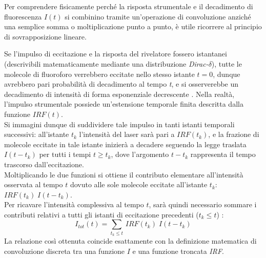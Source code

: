 Per comprendere fisicamente perché la risposta strumentale e il decadimento di fluorescenza $I(t)$ si combinino tramite un'operazione di convoluzione anziché una semplice somma o moltiplicazione punto a punto, è utile ricorrere al principio di sovrapposizione lineare.

Se l'impulso di eccitazione e la risposta del rivelatore fossero istantanei (descrivibili matematicamente mediante una distribuzione \textit{Dirac-$\delta$}), tutte le molecole di fluoroforo verrebbero eccitate nello stesso istante $t=0$, dunque avrebbero pari probabilità di decadimento al tempo \textit{t}, e si osserverebbe un decadimento di intensità di forma esponenziale decrescente \cite[Sez. 4.3.3]{lakowiczPrinciplesFluorescenceSpectroscopy2006}.
Nella realtà, l'impulso strumentale possiede un'estensione temporale finita descritta dalla funzione $\textit{IRF}(t)$.\\
Si immagini dunque di suddividere tale impulso in tanti istanti temporali successivi: all'istante $t_k$ l'intensità del laser sarà pari a $\textit{IRF}(t_k)$, e la frazione di molecole eccitate in tale istante inizierà a decadere seguendo la legge traslata $I(t-t_k)$ per tutti i tempi $t\ge t_k$, dove l'argomento $t-t_k$ rappresenta il tempo trascorso dall'eccitazione.\\
Moltiplicando le due funzioni si ottiene il contributo elementare all'intensità osservata al tempo $t$ dovuto alle sole molecole eccitate all'istante $t_k$: $\textit{IRF}(t_k)\;I(t-t_k)$.\\
Per ricavare l'intensità complessiva al tempo $t$, sarà quindi necessario sommare i contributi relativi a tutti gli istanti di eccitazione precedenti ($t_k\le t$) \cite[Sez. 4.3.3]{lakowiczPrinciplesFluorescenceSpectroscopy2006}:
\begin{equation}
    I_{tot}(t) = \sum_{t_k \le t} \, \textit{IRF}(t_k) \; I(t - t_k)
    \label{eq:convoluzione}
\end{equation}
La relazione così ottenuta coincide esattamente con la definizione matematica di convoluzione discreta tra una funzione $I$ e una funzione troncata \textit{IRF}.
